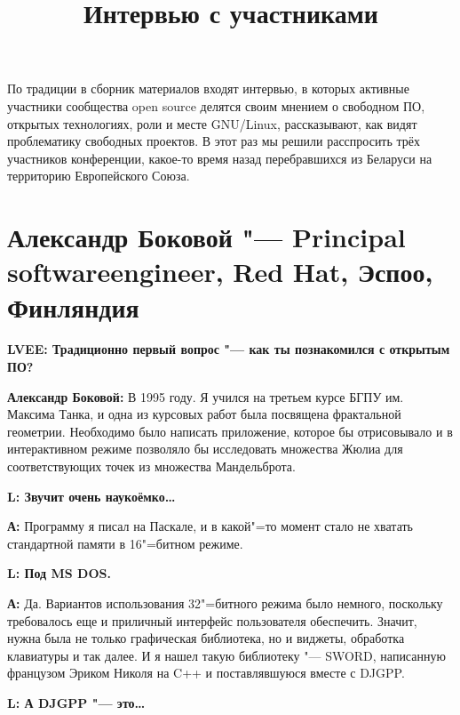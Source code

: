 \documentclass[10pt, a5paper]{article}
\begin{document}
\title{Интервью с участниками}
\date{}
\maketitle

По традиции в сборник материалов входят интервью, в которых активные участники сообщества open source делятся своим мнением о свободном ПО, открытых технологиях, роли и месте GNU/Linux, рассказывают, как видят проблематику свободных проектов. В этот раз мы решили расспросить трёх участников конференции, какое-то время назад перебравшихся из Беларуси на территорию Европейского Союза.

\section[Александр Боковой "--- Principal software engineer, Red Hat, Эспоо, Финляндия]{Александр Боковой "--- Principal software\linebreak engineer, Red Hat, Эспоо, Финляндия}

{\noindent \bf LVEE: Традиционно первый вопрос "--- как ты познакомился с открытым ПО?}

{\noindent \bf Александр Боковой:} В 1995 году. Я учился на третьем курсе БГПУ им. Максима Танка, и одна из курсовых
работ была посвящена фрактальной геометрии. Необходимо было написать
приложение, которое бы отрисовывало и в интерактивном режиме позволяло бы
исследовать множества Жюлиа для соответствующих точек из множества
Мандельброта. 

{\noindent \bf L: Звучит очень наукоёмко\ldots}

{\noindent \bf А:} Программу я писал на Паскале, и в какой"=то момент стало не хватать
стандартной памяти в 16"=битном режиме.

{\noindent \bf L: Под MS DOS.} 

{\noindent \bf А:}  Да. Вариантов использования 32"=битного
режима было немного, поскольку требовалось еще и приличный интерфейс
пользователя обеспечить. Значит, нужна была не только графическая библиотека,
но и виджеты, обработка клавиатуры и так далее. И я нашел такую библиотеку "--- SWORD,
написанную французом Эриком Николя на C++ и поставлявшуюся вместе с DJGPP.

{\noindent \bf L: А DJGPP "--- это\ldots}
\end{document}
